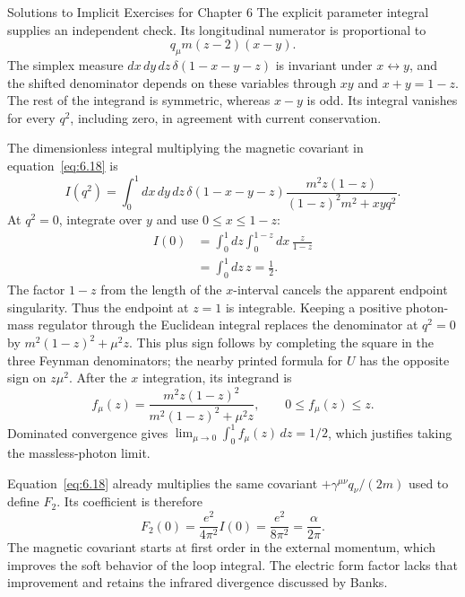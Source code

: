 \begin{bankssolutions}{Solutions to Implicit Exercises for Chapter 6}
The explicit parameter integral supplies an independent check.  Its
longitudinal numerator is proportional to
\begin{equation*}
 q_\mu m(z-2)(x-y).
\end{equation*}
The simplex measure
\(dx\,dy\,dz\,\delta(1-x-y-z)\) is invariant under
\(x\leftrightarrow y\), and the shifted denominator depends on these
variables through \(xy\) and \(x+y=1-z\).  The rest of the integrand is
symmetric, whereas \(x-y\) is odd.  Its integral vanishes for every
\(q^2\), including zero, in agreement with current conservation.

The dimensionless integral multiplying the magnetic covariant in
equation~\eqref{eq:6.18} is
\begin{equation*}
 I(q^2)=\int_0^1dx\,dy\,dz\,\delta(1-x-y-z)
 \frac{m^2z(1-z)}{(1-z)^2m^2+xyq^2}.
\end{equation*}
At \(q^2=0\), integrate over \(y\) and use
\(0\leq x\leq1-z\):
\begin{align*}
 I(0)
 &=\int_0^1dz\int_0^{1-z}dx\,
   \frac{z}{1-z}\\
 &=\int_0^1dz\,z=\frac12.
\end{align*}
The factor \(1-z\) from the length of the \(x\)-interval cancels the
apparent endpoint singularity.  Thus the endpoint at \(z=1\) is integrable.
Keeping a positive photon-mass regulator through the Euclidean integral
replaces the denominator at \(q^2=0\) by
\(m^2(1-z)^2+\mu^2z\).  This plus sign follows by completing the square in
the three Feynman denominators; the nearby printed formula for \(U\) has the
opposite sign on \(z\mu^2\).  After the \(x\) integration, its integrand is
\begin{equation*}
 f_\mu(z)=\frac{m^2z(1-z)^2}{m^2(1-z)^2+\mu^2z},
 \qquad 0\leq f_\mu(z)\leq z.
\end{equation*}
Dominated convergence gives
\(\lim_{\mu\to0}\int_0^1 f_\mu(z)\,dz=1/2\), which justifies taking the
massless-photon limit.

Equation~\eqref{eq:6.18} already multiplies the same covariant
\(+\gamma^{\mu\nu}q_\nu/(2m)\) used to define \(F_2\).  Its coefficient is
therefore
\begin{equation*}
 F_2(0)=\frac{e^2}{4\pi^2}I(0)
 =\frac{e^2}{8\pi^2}=\frac{\alpha}{2\pi}.
\end{equation*}
The magnetic covariant starts at first order in the external momentum, which
improves the soft behavior of the loop integral.  The electric form factor
lacks that improvement and retains the infrared divergence discussed by
Banks.

\end{bankssolutions}

